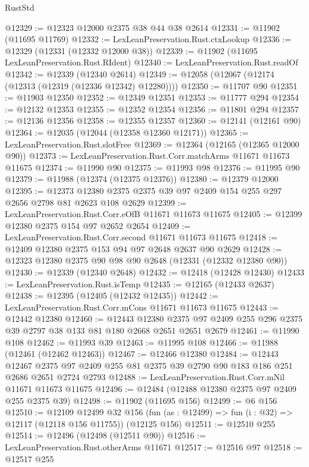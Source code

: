 \begin{lexlean}{RustStd}
\begin{coremodule}
@12329 := @12323 @12000 @2375 @38 @44 @38 @2614
@12331 := @11902 (@11695 @11769)
@12332 := LexLeanPreservation.Rust.ctxLookup
@12336 := @12329 (@12331 (@12332 @12000 @38))
@12339 := @11902 (@11695 LexLeanPreservation.Rust.RIdent)
@12340 := LexLeanPreservation.Rust.readOf
@12342 := @12339 (@12340 @2614)
@12349 := @12058 (@12067 (@12174 (@12313 (@12319 (@12336 @12342) @12280))))
@12350 := @11707 @90
@12351 := @11903 @12350
@12352 := @12349 @12351
@12353 := @11777 @294
@12354 := @12132 @12353
@12355 := @12352 @12354
@12356 := @11801 @294
@12357 := @12136 @12356
@12358 := @12355 @12357
@12360 := @12141 (@12161 @90)
@12364 := @12035 (@12044 (@12358 @12360 @12171))
@12365 := LexLeanPreservation.Rust.slotFree
@12369 := @12364 (@12165 (@12365 @12000 @90))
@12373 := LexLeanPreservation.Rust.Corr.matchArms @11671 @11673 @11675
@12374 := @11990 @90
@12375 := @11993 @98
@12376 := @11995 @90
@12379 := @11988 (@12374 (@12375 @12376))
@12380 := @12379 @12000
@12395 := @12373 @12380 @2375 @2375 @39 @97 @2409 @154 @255 @297 @2656 @2798 @81 @2623 @108 @2629
@12399 := LexLeanPreservation.Rust.Corr.eOfB @11671 @11673 @11675
@12405 := @12399 @12380 @2375 @154 @97 @2652 @2654
@12409 := LexLeanPreservation.Rust.Corr.second @11671 @11673 @11675
@12418 := @12409 @12380 @2375 @153 @94 @97 @2648 @2637 @90 @2629
@12428 := @12323 @12380 @2375 @90 @98 @90 @2648 (@12331 (@12332 @12380 @90))
@12430 := @12339 (@12340 @2648)
@12432 := @12418 (@12428 @12430)
@12433 := LexLeanPreservation.Rust.isTemp
@12435 := @12165 (@12433 @2637)
@12438 := @12395 (@12405 (@12432 @12435))
@12442 := LexLeanPreservation.Rust.Corr.mCons @11671 @11673 @11675
@12443 := @12442 @12380
@12460 := @12443
    @12380
    @2375
    @97
    @2409
    @255
    @296
    @2375
    @39
    @2797
    @38
    @133
    @81
    @180
    @2668
    @2651
    @2651
    @2679
@12461 := @11990 @108
@12462 := @11993 @39
@12463 := @11995 @108
@12466 := @11988 (@12461 (@12462 @12463))
@12467 := @12466 @12380
@12484 := @12443
    @12467
    @2375
    @97
    @2409
    @255
    @81
    @2375
    @39
    @2790
    @90
    @183
    @186
    @251
    @2686
    @2651
    @2724
    @2793
@12488 := LexLeanPreservation.Rust.Corr.mNil @11671 @11673 @11675
@12496 := @12484 (@12488 @12380 @2375 @97 @2409 @255 @2375 @39)
@12498 := @11902 (@11695 @156)
@12499 := @6 @156
@12510 := @12109
    @12499
    @32
    @156
    (fun (as : @12499) => fun (i : @32) => @12117 (@12118 @156 @11755))
    (@12125 @156)
@12511 := @12510 @255
@12514 := @12496 (@12498 (@12511 @90))
@12516 := LexLeanPreservation.Rust.otherArms @11671
@12517 := @12516 @97
@12518 := @12517 @255

\end{coremodule}
\end{lexlean}
